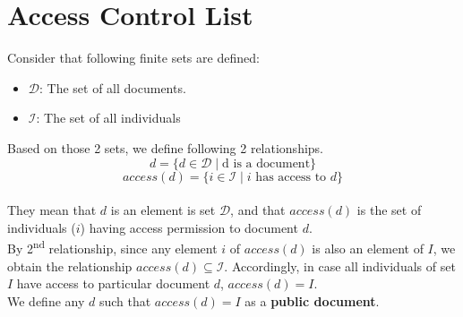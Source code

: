 \documentclass{article}
\begin{document}
\section{Access Control List}
\noindent
Consider that following finite sets are defined:
\begin{itemize}
    \item $\mathcal{D}$: The set of all documents.
    \item $\mathcal{I}$: The set of all individuals
\end{itemize}
Based on those 2 sets, we define following 2 relationships.
\[ d = \{ d \in \mathcal{D} \mid \text{d is a document} \} \]
\[ access(d) = \{ i \in \mathcal{I} \mid i \text{ has access to } d \} \] \\ 
\noindent
They mean that $d$ is an element is set $\mathcal{D}$, and that $access(d)$ is the set of individuals ($i$) having access permission to document $d$.\\ 
By 2\textsuperscript{nd} relationship, since any element $i$ of $access(d)$ is also an element of $I$, we obtain the relationship $access(d) \subseteq \mathcal{I}$. Accordingly, in case all individuals of set $I$ have access to particular document $d$, $access(d) = I$.\\
We define any $d$ such that $access(d) = I$ as a \textbf{public document}. \\ \\

\end{document}
